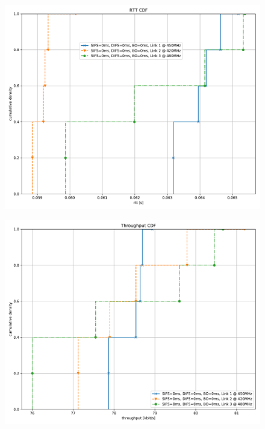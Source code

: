 \documentclass{article}
\begin{document}
\begin{figure}
	\includegraphics[width=\textwidth]{no_wait_single/cdf/rtt_cdf}
\end{figure}

\begin{figure}
	\includegraphics[width=\textwidth]{no_wait_single/cdf/throughput_cdf}
\end{figure}
\end{document}
